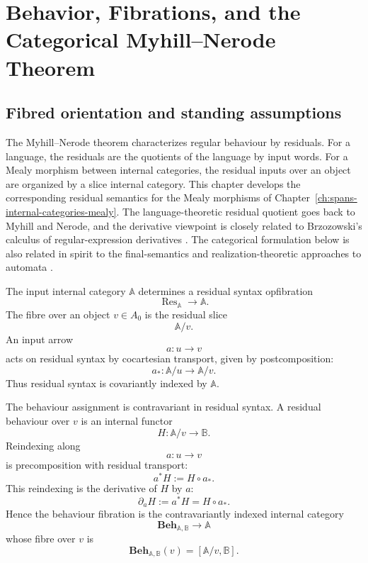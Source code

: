 \chapter{Behavior, Fibrations, and the Categorical Myhill--Nerode Theorem}
\label{ch:behaviour-categories-myhill-nerode}

\section{Fibred orientation and standing assumptions}
\label{sec:behaviour-standing-assumptions}

The Myhill--Nerode theorem characterizes regular behaviour by residuals. For a language, the residuals are the quotients of the language by input words. For a Mealy morphism between internal categories, the residual inputs over an object are organized by a slice internal category. This chapter develops the corresponding residual semantics for the Mealy morphisms of Chapter~\ref{ch:spans-internal-categories-mealy}. The language-theoretic residual quotient goes back to Myhill and Nerode, and the derivative viewpoint is closely related to Brzozowski's calculus of regular-expression derivatives \cite{Myhill1957,Nerode1958,Brzozowski1964}. The categorical formulation below is also related in spirit to the final-semantics and realization-theoretic approaches to automata \cite{Goguen1973,Rutten1998,Rutten2000}.

The input internal category \(\mathbb A\) determines a residual syntax opfibration
\[
    \operatorname{Res}_{\mathbb A}\longrightarrow \mathbb A.
\]
The fibre over an object \(v\in A_0\) is the residual slice
\[
    \mathbb A/v.
\]
An input arrow
\[
    a:u\to v
\]
acts on residual syntax by cocartesian transport, given by postcomposition:
\[
    a_*:\mathbb A/u\to\mathbb A/v.
\]
Thus residual syntax is covariantly indexed by \(\mathbb A\).

The behaviour assignment is contravariant in residual syntax. A residual behaviour over \(v\) is an internal functor
\[
    H:\mathbb A/v\to\mathbb B.
\]
Reindexing along
\[
    a:u\to v
\]
is precomposition with residual transport:
\[
    a^*H:=H\circ a_*.
\]
This reindexing is the derivative of \(H\) by \(a\):
\[
    \partial_aH:=a^*H=H\circ a_*.
\]
Hence the behaviour fibration is the contravariantly indexed internal category
\[
    \mathbf{Beh}_{\mathbb A,\mathbb B}\longrightarrow \mathbb A
\]
whose fibre over \(v\) is
\[
    \mathbf{Beh}_{\mathbb A,\mathbb B}(v)
    =
    [\mathbb A/v,\mathbb B].
\]

